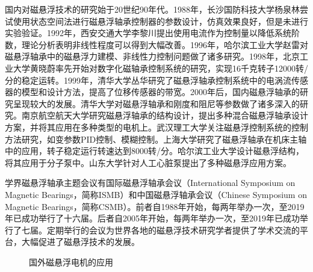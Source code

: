 \documentclass[
  lang=cn,
  degree=master,
  openany,oneside
]{nuaathesis}
\begin{document}
国内对磁悬浮技术的研究始于20世纪90年代。1988年，长沙国防科技大学杨泉林尝试使用状态空间法进行磁悬浮轴承控制器的参数设计\cite{杨泉林1988状态反馈去耦原理在磁悬浮轴承设计中的应用}，仿真效果良好，但是未进行实验验证。1992年，西安交通大学李黎川提出使用电流作为控制量以降低系统阶数，理论分析表明非线性程度可以得到大幅改善\cite{李黎川1992磁悬浮轴承物理模型的降阶及非线性改善}。1996年，哈尔滨工业大学赵雷对磁悬浮轴承中的磁悬浮力建模、非线性力控制问题做了诸多研究\cite{赵雷1996可控磁悬浮轴承刚度的提高与大范围稳定性,赵雷1996径向磁悬浮轴承结构特性研究及其模型的建立}。1998年，北京工业大学黄晓蔚率先开始对数字化磁轴承控制系统的研究，实现16千克转子12000转/分的稳定运转\cite{黄晓蔚1998数字控制的有源磁悬浮轴承的实验研究}。1999年，清华大学丛华研究了磁悬浮轴承控制系统中的电涡流传感器的模型和设计方法，提高了位移传感器的带宽\cite{丛华1999电涡流传感器动态响应特性研究}。2000年后，国内磁悬浮轴承的研究呈现较大的发展。清华大学对磁悬浮轴承和刚度和阻尼等参数做了诸多深入的研究\cite{赵雷1999可控磁悬浮轴承刚度与阻尼特性研究}。南京航空航天大学研究磁悬浮轴承的结构设计，提出多种混合磁悬浮轴承设计方案，并将其应用在多种类型的电机上\cite{朱熀秋2002永磁偏置径向,曾励1999永磁偏置的混合磁悬浮轴承的研究}。武汉理工大学关注磁悬浮控制系统的控制方法研究，如变参数PID控制、模糊控制\cite{苏义鑫2004磁悬浮轴承的变参数,刘晓军2006人工心脏泵磁悬浮转子非线性特性及控制方法研究}。上海大学研究了磁悬浮轴承在机床主轴中的应用，转子稳定运行转速达到8000转/分\cite{张钢2005磁悬浮支承技术在机床中的应用}。哈尔滨工业大学设计磁悬浮结构，将其应用于分子泵中\cite{周红海2006分子泵磁悬浮轴承结构及功率放大器设计}。山东大学针对人工心脏泵提出了多种磁悬浮应用方案\cite{关勇2010轴流式磁悬浮人工心脏泵磁悬浮轴承系统设计,杨晟2010轴流式磁悬浮人工心脏泵驱动电机的研究}。

学界磁悬浮轴承主题会议有国际磁悬浮轴承会议（International Symposium on Magnetic Bearings，简称ISMB）和中国磁悬浮轴承会议（Chinese Symposium on Magnetic Bearings，简称CSMB）。前者自1988年开始，每两年举办一次，至2019年已成功举行了十六届。后者自2005年开始，每两年举办一次，至2019年已成功举行了七届。定期举行的会议为世界各地的磁悬浮技术研究学者提供了学术交流的平台，大幅促进了磁悬浮技术的发展。

\begin{figure}[h!]
  \quad
  \quad
  \quad  
  \caption[国外磁悬浮电机的应用]{国外磁悬浮电机的应用\label{fig:industrial_amb}}
\end{figure}
\end{document}
